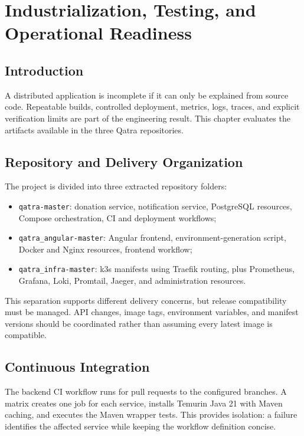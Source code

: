 \chapter{Industrialization, Testing, and Operational Readiness}

\section*{Introduction}
A distributed application is incomplete if it can only be explained from source code. Repeatable builds, controlled deployment, metrics, logs, traces, and explicit verification limits are part of the engineering result. This chapter evaluates the artifacts available in the three Qatra repositories.

\section{Repository and Delivery Organization}
The project is divided into three extracted repository folders:

\begin{itemize}
  \item \texttt{qatra-master}: donation service, notification service, PostgreSQL resources, Compose orchestration, CI and deployment workflows;
  \item \texttt{qatra\_angular-master}: Angular frontend, environment-generation script, Docker and Nginx resources, frontend workflow;
  \item \texttt{qatra\_infra-master}: k3s manifests using Traefik routing, plus Prometheus, Grafana, Loki, Promtail, Jaeger, and administration resources.
\end{itemize}

This separation supports different delivery concerns, but release compatibility must be managed. API changes, image tags, environment variables, and manifest versions should be coordinated rather than assuming every latest image is compatible.

\section{Continuous Integration}
The backend CI workflow runs for pull requests to the configured branches. A matrix creates one job for each service, installs Temurin Java 21 with Maven caching, and executes the Maven wrapper tests. This provides isolation: a failure identifies the affected service while keeping the workflow definition concise.

